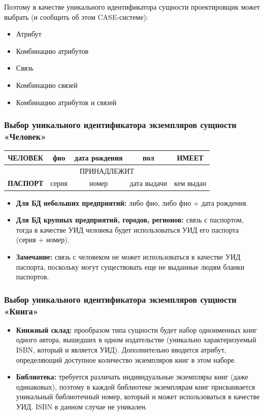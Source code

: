 \documentclass[a4paper,12pt]{article}
\begin{document}
Поэтому в качестве уникального идентификатора сущности проектировщик может выбрать (и сообщить об этом CASE-системе):
\begin{itemize}
    \item Атрибут
    \item Комбинацию атрибутов
    \item Связь
    \item Комбинацию связей
    \item Комбинацию атрибутов и связей
\end{itemize}

\subsubsection{Выбор уникального идентификатора экземпляров сущности «Человек»}

\begin{center}
    \begin{tabular}{|c|c|c|c|c|}
        \hline
        \textbf{ЧЕЛОВЕК} & фио & дата рождения & пол & \textbf{ИМЕЕТ} \\
        \hline
        \multicolumn{5}{|c|}{ПРИНАДЛЕЖИТ} \\
        \hline
        \textbf{ПАСПОРТ} & серия & номер & дата выдачи & кем выдан \\
        \hline
    \end{tabular}
\end{center}

\begin{itemize}
    \item \textbf{Для БД небольших предприятий:} либо фио, либо фио + дата рождения.
    \item \textbf{Для БД крупных предприятий, городов, регионов:} связь с паспортом, тогда в качестве УИД человека будет использоваться УИД его паспорта (серия + номер).
    \item \textbf{Замечание:} связь с человеком не может использоваться в качестве УИД паспорта, поскольку могут существовать еще не выданные людям бланки паспортов.
\end{itemize}

\subsubsection{Выбор уникального идентификатора экземпляров сущности «Книга»}

\begin{itemize}
    \item \textbf{Книжный склад:} прообразом типа сущности будет набор одноименных книг одного автора, вышедших в одном издательстве (уникально характеризуемый ISBN, который и является УИД). Дополнительно вводится атрибут, определяющий доступное количество экземпляров книг в этом наборе.
    
    \item \textbf{Библиотека:} требуется различать индивидуальные экземпляры книг (даже одинаковых), поэтому в каждой библиотеке экземплярам книг присваивается уникальный библиотечный номер, который и может использоваться в качестве УИД. ISBN в данном случае не уникален.
\end{itemize}
\end{document}
